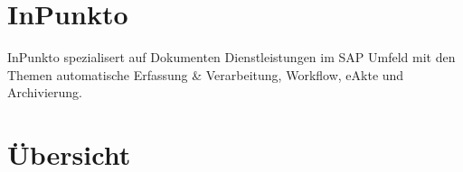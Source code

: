 \section{InPunkto}
InPunkto spezialisert auf Dokumenten Dienstleistungen im SAP Umfeld mit den Themen automatische Erfassung \& Verarbeitung, Workflow, 
eAkte und Archivierung.


\section{Übersicht}
%

\begin{comment}
\begin{tabulary}{\textwidth}{LLLL}
Thema & Codia & InPunkto & \brand \\
Automatisierte Klassifizierung & J & J & N \\
Attributierung & & & \\
semantisch & J & kA & N\\
fachlich & J & J & J \\
Automatisierte Attributierung & N & N & J \\
Steuerung & lastabhängige Aufgabenverteilung\newline über Workflowsystem & kA & Priorisierung\\
(Rechnungs) Workflow & d3ecm & SAP Workflow & freie Wahl \\
Export & d3.ecm & SAP & Rohexport als xml\\
\end{tabulary}
\end{comment}
